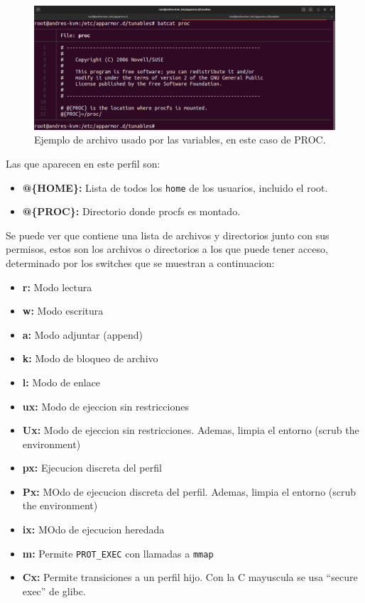 \documentclass{article}
\begin{document}
\begin{figure}[H]
    \includegraphics[width=\textwidth]{imagenes/Captura desde 2022-10-18 16-25-52.png}
    \caption{Ejemplo de archivo usado por las variables, en este caso de PROC.}
\end{figure}

\bigskip

Las que aparecen en este perfil son:

\begin{itemize}
    \item \textbf{@\{HOME\}: }Lista de todos los \verb|home| de los usuarios, incluido el root.
    \item \textbf{@\{PROC\}: }Directorio donde procfs es montado.
\end{itemize}

\newpage

Se puede ver que contiene una lista de archivos y directorios junto con sus permisos, estos son los archivos o directorios a los que puede tener acceso, determinado por los switches que se muestran a continuacion:

\begin{itemize}
    \item \textbf{r: }Modo lectura
    \item \textbf{w: }Modo escritura
    \item \textbf{a: }Modo adjuntar (append)
    \item \textbf{k: }Modo de bloqueo de archivo
    \item \textbf{l: }Modo de enlace
    \item \textbf{ux: }Modo de ejeccion sin restricciones
    \item \textbf{Ux: }Modo de ejeccion sin restricciones. Ademas, limpia el entorno (scrub the environment)
    \item \textbf{px: }Ejecucion discreta del perfil
    \item \textbf{Px: }MOdo de ejecucion discreta del perfil. Ademas, limpia el entorno (scrub the environment)
    \item \textbf{ix: }MOdo de ejecucion heredada
    \item \textbf{m: }Permite \verb|PROT_EXEC| con llamadas a \verb|mmap|
    \item \textbf{Cx: }Permite transiciones a un perfil hijo. Con la C mayuscula se usa ``secure exec'' de glibc.
\end{itemize}
\end{document}
